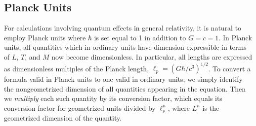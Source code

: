 \subsection*{Planck Units}

For calculations involving quantum effects in general relativity, it is natural to
employ Planck units where \(\hbar\) is set equal to 1 in addition to \(G=c=1\). In
Planck units, all quantities which in ordinary units have dimension expressible in
terms of \(L\), \(T\), and \(M\) now become dimensionless. In particular, all lengths
are expressed as dimensionless multiples of the Planck length,
\(\ell_p=(G\hbar/c^3)^{1/2}\). To convert a formula valid in Planck units to one
valid in ordinary units, we simply identify the nongeometrized dimension of all
quantities appearing in the equation. Then we \emph{multiply} each such quantity by
its conversion factor, which equals its conversion factor for geometrized units
divided by \(\ell_p^n\), where \(L^n\) is the geometrized dimension of the quantity.


